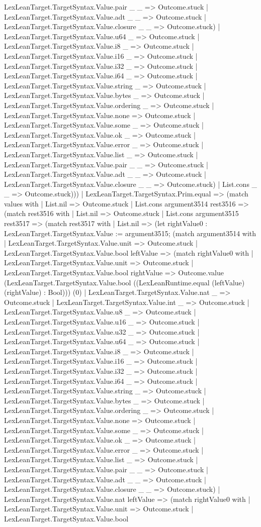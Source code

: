 \documentclass[11pt]{article}
\begin{document}
LexLeanTarget.TargetSyntax.Value.pair \_ \_ => Outcome.stuck | LexLeanTarget.TargetSyntax.Value.adt \_ \_ => Outcome.stuck | LexLeanTarget.TargetSyntax.Value.closure \_ \_ => Outcome.stuck) | LexLeanTarget.TargetSyntax.Value.u64 \_ => Outcome.stuck | LexLeanTarget.TargetSyntax.Value.i8 \_ => Outcome.stuck | LexLeanTarget.TargetSyntax.Value.i16 \_ => Outcome.stuck | LexLeanTarget.TargetSyntax.Value.i32 \_ => Outcome.stuck | LexLeanTarget.TargetSyntax.Value.i64 \_ => Outcome.stuck | LexLeanTarget.TargetSyntax.Value.string \_ => Outcome.stuck | LexLeanTarget.TargetSyntax.Value.bytes \_ => Outcome.stuck | LexLeanTarget.TargetSyntax.Value.ordering \_ => Outcome.stuck | LexLeanTarget.TargetSyntax.Value.none => Outcome.stuck | LexLeanTarget.TargetSyntax.Value.some \_ => Outcome.stuck | LexLeanTarget.TargetSyntax.Value.ok \_ => Outcome.stuck | LexLeanTarget.TargetSyntax.Value.error \_ => Outcome.stuck | LexLeanTarget.TargetSyntax.Value.list \_ => Outcome.stuck | LexLeanTarget.TargetSyntax.Value.pair \_ \_ => Outcome.stuck | LexLeanTarget.TargetSyntax.Value.adt \_ \_ => Outcome.stuck | LexLeanTarget.TargetSyntax.Value.closure \_ \_ => Outcome.stuck) | List.cons \_ \_ => Outcome.stuck))) | LexLeanTarget.TargetSyntax.Prim.equal => (match values with | List.nil => Outcome.stuck | List.cons argument3514 rest3516 => (match rest3516 with | List.nil => Outcome.stuck | List.cons argument3515 rest3517 => (match rest3517 with | List.nil => (let rightValue0 : LexLeanTarget.TargetSyntax.Value := argument3515; (match argument3514 with | LexLeanTarget.TargetSyntax.Value.unit => Outcome.stuck | LexLeanTarget.TargetSyntax.Value.bool leftValue => (match rightValue0 with | LexLeanTarget.TargetSyntax.Value.unit => Outcome.stuck | LexLeanTarget.TargetSyntax.Value.bool rightValue => Outcome.value (LexLeanTarget.TargetSyntax.Value.bool ((LexLeanRuntime.equal (leftValue) (rightValue) : Bool))) (0) | LexLeanTarget.TargetSyntax.Value.nat \_ => Outcome.stuck | LexLeanTarget.TargetSyntax.Value.int \_ => Outcome.stuck | LexLeanTarget.TargetSyntax.Value.u8 \_ => Outcome.stuck | LexLeanTarget.TargetSyntax.Value.u16 \_ => Outcome.stuck | LexLeanTarget.TargetSyntax.Value.u32 \_ => Outcome.stuck | LexLeanTarget.TargetSyntax.Value.u64 \_ => Outcome.stuck | LexLeanTarget.TargetSyntax.Value.i8 \_ => Outcome.stuck | LexLeanTarget.TargetSyntax.Value.i16 \_ => Outcome.stuck | LexLeanTarget.TargetSyntax.Value.i32 \_ => Outcome.stuck | LexLeanTarget.TargetSyntax.Value.i64 \_ => Outcome.stuck | LexLeanTarget.TargetSyntax.Value.string \_ => Outcome.stuck | LexLeanTarget.TargetSyntax.Value.bytes \_ => Outcome.stuck | LexLeanTarget.TargetSyntax.Value.ordering \_ => Outcome.stuck | LexLeanTarget.TargetSyntax.Value.none => Outcome.stuck | LexLeanTarget.TargetSyntax.Value.some \_ => Outcome.stuck | LexLeanTarget.TargetSyntax.Value.ok \_ => Outcome.stuck | LexLeanTarget.TargetSyntax.Value.error \_ => Outcome.stuck | LexLeanTarget.TargetSyntax.Value.list \_ => Outcome.stuck | LexLeanTarget.TargetSyntax.Value.pair \_ \_ => Outcome.stuck | LexLeanTarget.TargetSyntax.Value.adt \_ \_ => Outcome.stuck | LexLeanTarget.TargetSyntax.Value.closure \_ \_ => Outcome.stuck) | LexLeanTarget.TargetSyntax.Value.nat leftValue => (match rightValue0 with | LexLeanTarget.TargetSyntax.Value.unit => Outcome.stuck | LexLeanTarget.TargetSyntax.Value.bool 
\end{document}
